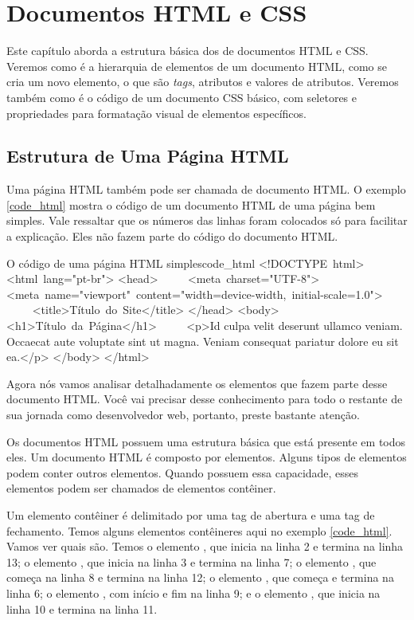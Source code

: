 \chapter{Documentos HTML e CSS}

Este capítulo aborda a estrutura básica dos de documentos HTML e CSS. Veremos como é a hierarquia de elementos de um documento HTML, como se cria um novo elemento, o que são \textit{tags}, atributos e valores de atributos. Veremos também como é o código de um documento CSS básico, com seletores e propriedades para formatação visual de elementos específicos.

\section{Estrutura de Uma Página HTML}

Uma página HTML também pode ser chamada de documento HTML. O exemplo \ref{code_html} mostra o código de um documento HTML de uma página bem simples. Vale ressaltar que os números das linhas foram colocados só para facilitar a explicação. Eles não fazem parte do código do documento HTML.

\begin{htmlcode}{O código de uma página HTML simples}{code_html}
<!DOCTYPE html>
<html lang="pt-br">
   <head>
      <meta charset="UTF-8">
      <meta name="viewport" content="width=device-width, initial-scale=1.0">
      <title>Título do Site</title>
   </head>
   <body>
      <h1>Título da Página</h1>
      <p>Id culpa velit deserunt ullamco veniam. Occaecat aute voluptate    
       sint ut magna. Veniam consequat pariatur dolore eu sit ea.</p>
   </body>
</html>
\end{htmlcode}

Agora nós vamos analisar detalhadamente os elementos que fazem parte desse documento HTML. Você vai precisar desse conhecimento para todo o restante de sua jornada como desenvolvedor web, portanto, preste bastante atenção. 

Os documentos HTML possuem uma estrutura básica que está presente em todos eles. Um documento HTML é composto por elementos. Alguns tipos de elementos podem conter outros elementos. Quando possuem essa capacidade, esses elementos podem ser chamados de elementos contêiner.

Um elemento contêiner é delimitado por uma tag de abertura e uma tag de fechamento. Temos alguns elementos contêineres aqui no exemplo \ref{code_html}. Vamos ver quais são. Temos o elemento , que inicia na linha 2 e termina na linha 13; o elemento , que inicia na linha 3 e termina na linha 7; o elemento , que começa na linha 8 e termina na linha 12; o elemento , que começa e termina na linha 6; o elemento , com início e fim na linha 9; e o elemento , que inicia na linha 10 e termina na linha 11. 

